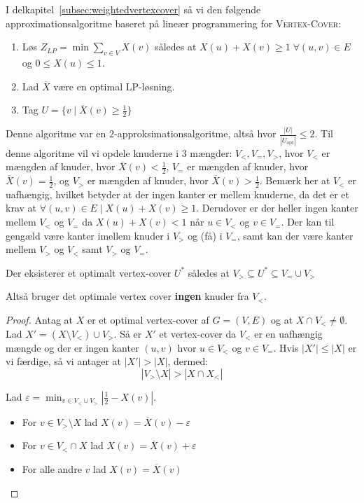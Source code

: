 I delkapitel~\ref{subsec:weightedvertexcover} så vi den følgende approximationsalgoritme baseret på lineær programmering for \textsc{Vertex-Cover}:
\begin{enumerate}
  \item Løs $Z_{LP} = \min \sum_{v \in V} X(v)$ således at $X(u)+X(v) \ge 1 \; \forall (u,v) \in E$ og $0 \le X(u) \le 1$.
  \item Lad $\overline{X}$ være en optimal LP-løsning.
  \item Tag $U = \{v \mid \overline{X}(v) \ge \frac{1}{2}\}$
\end{enumerate}

Denne algoritme var en $2$-approksimationsalgoritme, altså hvor $\frac{|U|}{|U_{\text{opt}}|} \le 2$. Til denne algoritme vil vi opdele knuderne i 3 mængder: $V_{<}, V_{=}, V_{>}$, hvor $V_{<}$ er mængden af knuder, hvor $\overline{X}(v) < \frac{1}{2}$, $V_{=}$ er mængden af knuder, hvor $\overline{X}(v) = \frac{1}{2}$, og $V_{>}$ er mængden af knuder, hvor $\overline{X}(v) > \frac{1}{2}$. Bemærk her at $V_{<}$ er uafhængig, hvilket betyder at der ingen kanter er mellem knuderne, da det er et krav at $\forall (u,v) \in E \mid X(u) + X(v) \ge 1$. Derudover er der heller ingen kanter mellem $V_{<}$ og $V_{=}$ da $X(u) + X(v) < 1$ når $u \in V_{<}$ og $v \in V_{=}$. Der kan til gengæld være kanter imellem knuder i $V_{>}$ og (få) i $V_{=}$, samt kan der være kanter mellem $V_{>}$ og $V_{<}$ samt $V_{>}$ og $V_{=}$.

\begin{theorem}
Der eksisterer et optimalt vertex-cover $U^{*}$ således at $V_{>} \subseteq U^{*} \subseteq V_{=} \cup V_{>}$
\end{theorem}

Altså bruger det optimale vertex cover \textbf{ingen} knuder fra $V_{<}$.

\begin{proof}
  Antag at $X$ er et optimal vertex-cover af $G = (V,E)$ og at $X \cap V_{<} \ne \emptyset$. Lad $X' = (X \setminus V_{<}) \cup V_{>}$. Så er $X'$ et vertex-cover da $V_{<}$ er en uafhængig mængde og der er ingen kanter $(u,v)$ hvor $u \in V_{<}$ og $v \in V_{=}$.
  Hvis $|X'| \le |X|$ er vi færdige, så vi antager at $|X'| > |X|$, dermed:
  \begin{equation}
\label{eq:vmxgtxcvl}
|V_{>} \setminus X| > |X \cap X_{<}|
  \end{equation}

  Lad \(\varepsilon = \min_{v \in V_{<} \cup V_{>}} |\frac{1}{2} - X(v)| \).

  \begin{itemize}
	\item For $v \in V_{>} \setminus X$ lad $X(v) =  \overline{X}(v) - \varepsilon$
	\item For $v \in V_{<} \cap X$ lad $X(v) = \overline{X}(v) + \varepsilon$
	\item For alle andre $v$ lad $X(v) = \overline{X}(v)$
  \end{itemize}

\end{proof}


